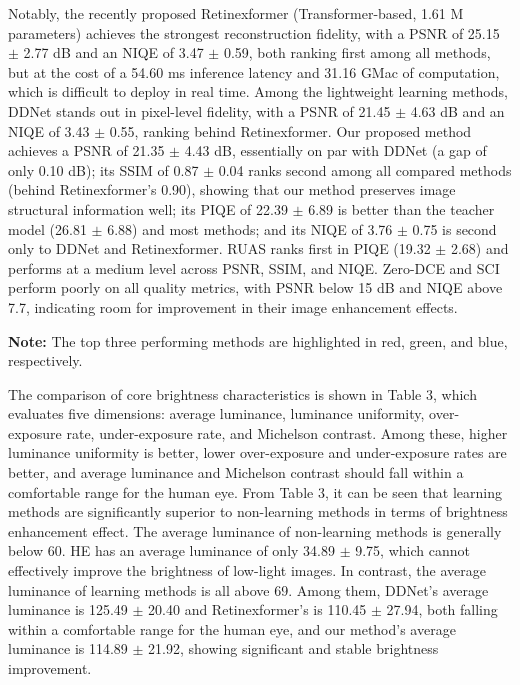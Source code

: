 \documentclass[sensors,article,submit,moreauthors]{Definitions/mdpi}
\begin{document}
Notably, the recently proposed Retinexformer \cite{ref34} (Transformer-based, 1.61 M parameters) achieves the strongest reconstruction fidelity, with a PSNR of 25.15 $\pm$ 2.77 dB and an NIQE of 3.47 $\pm$ 0.59, both ranking first among all methods, but at the cost of a 54.60 ms inference latency and 31.16 GMac of computation, which is difficult to deploy in real time. Among the lightweight learning methods, DDNet stands out in pixel-level fidelity, with a PSNR of 21.45 $\pm$ 4.63 dB and an NIQE of 3.43 $\pm$ 0.55, ranking behind Retinexformer. Our proposed method achieves a PSNR of 21.35 $\pm$ 4.43 dB, essentially on par with DDNet (a gap of only 0.10 dB); its SSIM of 0.87 $\pm$ 0.04 ranks second among all compared methods (behind Retinexformer's 0.90), showing that our method preserves image structural information well; its PIQE of 22.39 $\pm$ 6.89 is better than the teacher model (26.81 $\pm$ 6.88) and most methods; and its NIQE of 3.76 $\pm$ 0.75 is second only to DDNet and Retinexformer. RUAS ranks first in PIQE (19.32 $\pm$ 2.68) and performs at a medium level across PSNR, SSIM, and NIQE. Zero-DCE and SCI perform poorly on all quality metrics, with PSNR below 15 dB and NIQE above 7.7, indicating room for improvement in their image enhancement effects.

\textbf{Note:} The top three performing methods are highlighted in red, green, and blue, respectively.

The comparison of core brightness characteristics is shown in Table 3, which evaluates five dimensions: average luminance, luminance uniformity, over-exposure rate, under-exposure rate, and Michelson contrast. Among these, higher luminance uniformity is better, lower over-exposure and under-exposure rates are better, and average luminance and Michelson contrast should fall within a comfortable range for the human eye. From Table 3, it can be seen that learning methods are significantly superior to non-learning methods in terms of brightness enhancement effect. The average luminance of non-learning methods is generally below 60. HE has an average luminance of only 34.89 $\pm$ 9.75, which cannot effectively improve the brightness of low-light images. In contrast, the average luminance of learning methods is all above 69. Among them, DDNet's average luminance is 125.49 $\pm$ 20.40 and Retinexformer's is 110.45 $\pm$ 27.94, both falling within a comfortable range for the human eye, and our method's average luminance is 114.89 $\pm$ 21.92, showing significant and stable brightness improvement.
\end{document}
